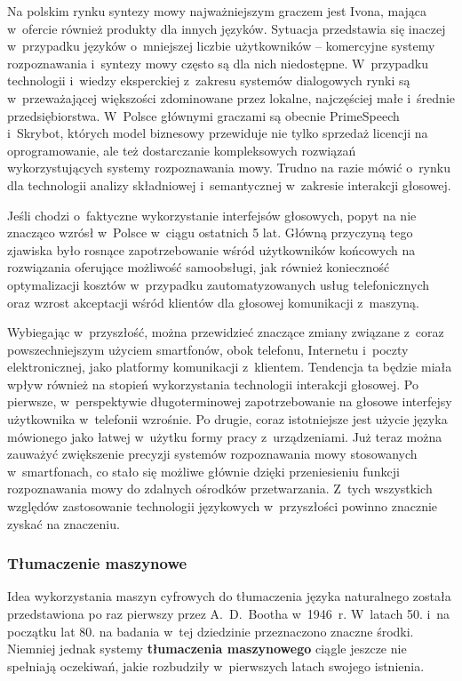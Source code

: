 \begin{multicols}{2}
Na polskim rynku syntezy mowy najważniejszym graczem jest Ivona,
mająca w~ofercie również produkty dla innych języków. Sytuacja
przedstawia się inaczej w~przypadku języków o~mniejszej liczbie
użytkowników – komercyjne systemy rozpoznawania i~syntezy mowy
często są dla nich niedostępne. W~przypadku technologii i~wiedzy
eksperckiej z~zakresu systemów dialogowych rynki są
w~przeważającej większości zdominowane przez lokalne,
najczęściej małe i~średnie przedsiębiorstwa. W~Polsce głównymi
graczami są obecnie PrimeSpeech i~Skrybot, których model biznesowy
przewiduje nie tylko sprzedaż licencji na oprogramowanie, ale też
dostarczanie kompleksowych rozwiązań wykorzystujących systemy
rozpoznawania mowy. Trudno na razie mówić o~rynku dla technologii
analizy składniowej i~semantycznej w~zakresie interakcji głosowej. 

Jeśli chodzi o~faktyczne wykorzystanie interfejsów głosowych, popyt
na nie znacząco wzrósł w~Polsce w~ciągu ostatnich 5 lat. Główną
przyczyną tego zjawiska było rosnące zapotrzebowanie wśród
użytkowników końcowych na rozwiązania oferujące możliwość
samoobsługi, jak również konieczność optymalizacji kosztów
w~przypadku zautomatyzowanych usług telefonicznych oraz wzrost
akceptacji wśród klientów dla głosowej komunikacji z~maszyną. 

Wybiegając w~przyszłość, można przewidzieć znaczące zmiany
związane z~coraz powszechniejszym użyciem smartfonów, obok
telefonu, Internetu i~poczty elektronicznej, jako platformy
komunikacji z~klientem. Tendencja ta będzie miała wpływ również
na stopień wykorzystania technologii interakcji głosowej. Po
pierwsze, w~perspektywie długoterminowej zapotrzebowanie na głosowe
interfejsy użytkownika w~telefonii wzrośnie. Po drugie, coraz
istotniejsze jest użycie języka mówionego jako łatwej w~użytku
formy pracy z~urządzeniami. Już teraz można zauważyć zwiększenie
precyzji systemów rozpoznawania mowy stosowanych w~smartfonach, co
stało się możliwe głównie dzięki przeniesieniu funkcji
rozpoznawania mowy do zdalnych ośrodków przetwarzania. Z~tych
wszystkich względów zastosowanie technologii językowych
w~przyszłości powinno znacznie zyskać na znaczeniu. 

\subsubsection[Tłumaczenie maszynowe]{Tłumaczenie maszynowe} 

Idea wykorzystania maszyn cyfrowych do tłumaczenia języka
naturalnego została przedstawiona po raz pierwszy przez A.~D.~Bootha
w~1946~r. W~latach 50. i~na początku lat 80. na badania w~tej
dziedzinie przeznaczono znaczne środki. Niemniej jednak systemy
\textbf{tłumaczenia maszynowego} ciągle jeszcze nie spełniają
oczekiwań, jakie rozbudziły w~pierwszych latach swojego istnienia. 


\end{multicols}
